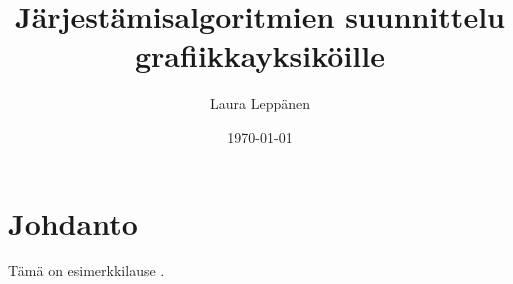 \documentclass[a4paper,12pt]{article}
\begin{document}
\title{Järjestämisalgoritmien suunnittelu grafiikkayksiköille}
\author{Laura Leppänen}
\date{\today}
\maketitle

\tableofcontents

\newpage

\section{Johdanto}

Tämä on esimerkkilause \cite{satish2009}. \cite{kolonias2011}

\printbibliography
\end{document}
